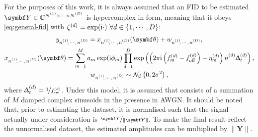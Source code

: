 For the purposes of this work, it is always assumed that an \ac{FID} to be
estimated
$\bY \in \mathbb{C}^{\None \times \cdots \times \ND}$
is hypercomplex in form, meaning that it obeys
\cref{eq:general-fid} with $\zeta^{(d)} = \exp(\mathrm{i} \cdot)\ \forall d \in
\lbrace 1, \cdots, D \rbrace$:
\begin{subequations}
    \begin{gather}
        \ynonenD = \xnonenD(\bth) + \wnonenD,\\
        \xnonenD(\bth) =
        \sumM \amexpphim
        \prodD \exp\left(\left(
            2 \pi \iu \left(f^{(d)}_m - \foffd\right)
            -\eta_m^{(d)}\right)
            \nd \Dtd\right),\label{eq:x}\\
        \wnonenD \sim \mathcal{N_C}\left(0, 2\sigma^2\right),%
    \end{gather}%
    \label{eq:hypercomplex-fid}%
\end{subequations}%
where $\Updelta_t^{(d)} = \nicefrac{1}{f_{\mathrm{sw}}^{(d)}}$.
Under this model, it is assumed that
 consists of a summation of $M$ damped complex sinusoids in the
presence in \ac{AWGN}.
It should be noted that, prior to estimating the dataset, it is normalised
such that the signal actually under consideration is $\nicefrac{\bY}{\lVert \bY
\rVert}$.
To make the final result reflect the unnormalised dataset, the estimated
amplitudes can be multiplied by $\lVert \symbf{Y} \rVert$.

